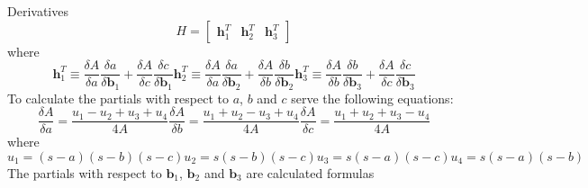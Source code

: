 \documentclass[12pt,a4paper,twoside]{article}
\begin{document}
Derivatives
\begin{equation}
H = \begin{bmatrix}
\bm{h}_1^T & \bm{h}_2^T & \bm{h}_3^T
\end{bmatrix}
\end{equation}
where
\begin{subequations}
\begin{equation}
\bm{h}_1^T \equiv \frac{\delta A}{\delta a}\frac{\delta a}{\delta\bm{b}_1} + \frac{\delta A}{\delta c}\frac{\delta c}{\delta\bm{b}_1}
\end{equation}
\begin{equation}
\bm{h}_2^T \equiv \frac{\delta A}{\delta a}\frac{\delta a}{\delta\bm{b}_2} + \frac{\delta A}{\delta b}\frac{\delta b}{\delta\bm{b}_2}
\end{equation}
\begin{equation}
\bm{h}_3^T \equiv \frac{\delta A}{\delta b}\frac{\delta b}{\delta\bm{b}_3} + \frac{\delta A}{\delta c}\frac{\delta c}{\delta\bm{b}_3} 
\end{equation}
\end{subequations}
To calculate the partials with respect to $a$, $b$ and $c$ serve the following equations:
\begin{subequations}
\begin{equation}
\frac{\delta A}{\delta a} = \frac{u_1 - u_2 + u_3 + u_4}{4A}
\end{equation}
\begin{equation}
\frac{\delta A}{\delta b} = \frac{u_1 + u_2 - u_3 + u_4}{4A}
\end{equation}
\begin{equation}
\frac{\delta A}{\delta c} = \frac{u_1 + u_2 + u_3 - u_4}{4A}
\end{equation}
\end{subequations}
where
\begin{subequations}
\begin{equation}
u_1 = (s - a)(s - b)(s - c)
\end{equation}
\begin{equation}
u_2 = s(s - b)(s - c)
\end{equation}
\begin{equation}
u_3 = s(s - a)(s - c)
\end{equation}
\begin{equation}
u_4 = s(s - a)(s - b)
\end{equation}
\end{subequations}
The partials with respect to $\bm{b}_1$, $\bm{b}_2$ and $\bm{b}_3$ are calculated formulas
\end{document}

